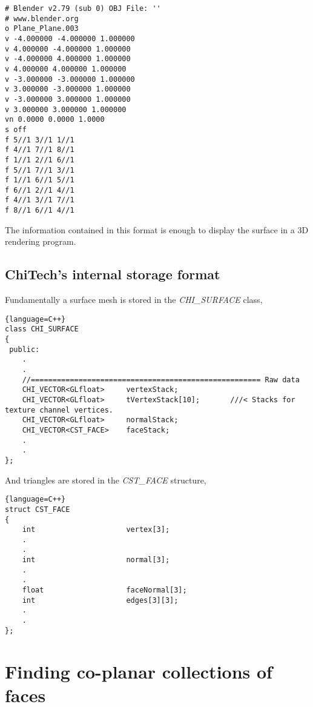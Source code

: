 \documentclass[11pt,letterpaper,titlepage]{article}
\begin{document}
\begin{verbatim}
# Blender v2.79 (sub 0) OBJ File: ''
# www.blender.org
o Plane_Plane.003
v -4.000000 -4.000000 1.000000
v 4.000000 -4.000000 1.000000
v -4.000000 4.000000 1.000000
v 4.000000 4.000000 1.000000
v -3.000000 -3.000000 1.000000
v 3.000000 -3.000000 1.000000
v -3.000000 3.000000 1.000000
v 3.000000 3.000000 1.000000
vn 0.0000 0.0000 1.0000
s off
f 5//1 3//1 1//1
f 4//1 7//1 8//1
f 1//1 2//1 6//1
f 5//1 7//1 3//1
f 1//1 6//1 5//1
f 6//1 2//1 4//1
f 4//1 3//1 7//1
f 8//1 6//1 4//1
\end{verbatim}

\noindent The information contained in this format is enough to display the surface in a 3D rendering program.

\newpage
\subsection{ChiTech's internal storage format}
Fundamentally a surface mesh is stored in the \textit{CHI\_SURFACE} class,

\begin{lstlisting}{language=C++}
class CHI_SURFACE
{
 public:
	.
	.	
	//===================================================== Raw data
	CHI_VECTOR<GLfloat>		vertexStack;			
	CHI_VECTOR<GLfloat>		tVertexStack[10];		///< Stacks for texture channel vertices.
	CHI_VECTOR<GLfloat>     normalStack;           
	CHI_VECTOR<CST_FACE>	faceStack;			
	.
	.
};
\end{lstlisting}

\noindent And triangles are stored in the \textit{CST\_FACE} structure,

\begin{lstlisting}{language=C++}
struct CST_FACE
{
	int						vertex[3];
	.
	.
	int                     normal[3];
	.
	.
	float                   faceNormal[3];
	int                     edges[3][3];
	.
	.
};
\end{lstlisting}

\newpage
{}
\section{Finding co-planar collections of faces}
\end{document}
